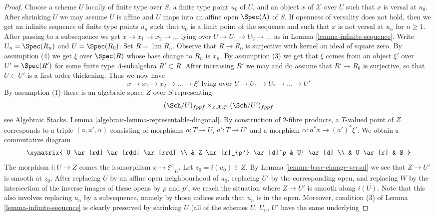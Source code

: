 \begin{proof}
Choose a scheme $U$ locally of finite type over $S$,
a finite type point $u_0$ of $U$, and an object $x$ of $\mathcal{X}$
over $U$ such that $x$ is versal at $u_0$. After shrinking
$U$ we may assume $U$ is affine and $U$ maps into an affine open
$\Spec(\Lambda)$ of $S$. If openness of versality does not hold,
then we get an infinite sequence of finite type points $u_n$ such
that $u_0$ is a limit point of the sequence and such that $x$ is not versal
at $u_n$ for $n \geq 1$. After passing to a subsequence we
get $x \to x_1 \to x_2 \to \ldots$ lying over
$U \to U_1 \to U_2 \to \ldots$ as in Lemma \ref{lemma-infinite-sequence}.
Write $U_n = \Spec(R_n)$ and $U = \Spec(R_0)$.
Set $R = \lim R_n$. Observe that $R \to R_0$ is surjective
with kernel an ideal of square zero. By assumption (4)
we get $\xi$ over $\Spec(R)$ whose base change to $R_n$ is $x_n$.
By assumption (3) we get that $\xi$ comes from an object $\xi'$ over
$U' = \Spec(R')$ for some finite type $\Lambda$-subalgebra
$R' \subset R$. After increasing $R'$ we may and do assume that
$R' \to R_0$ is surjective, so that $U \subset U'$ is a first order thickening.
Thus we now have
$$
x \to x_1 \to x_2 \to \ldots \to \xi'
\text{ lying over }
U \to U_1 \to U_2 \to \ldots \to U'
$$
By assumption (1) there is an algebraic space $Z$ over $S$ representing
$$
(\Sch/U)_{fppf} \times_{x, \mathcal{X}, \xi'} (\Sch/U')_{fppf}
$$
see Algebraic Stacks, Lemma \ref{algebraic-lemma-representable-diagonal}.
By construction of $2$-fibre products, a $T$-valued point of $Z$
corresponds to a triple $(a, a', \alpha)$ consisting of morphisms
$a : T \to U$, $a' : T \to U'$ and a morphism $\alpha : a^*x \to (a')^*\xi'$.
We obtain a commutative diagram
$$
\xymatrix{
U \ar[rd] \ar[rdd] \ar[rrd] \\
& Z \ar[r]_{p'} \ar[d]^p & U' \ar[d] \\
& U \ar[r] & S
}
$$
The morphism $i : U \to Z$ comes the isomorphism $x \to \xi'|_U$.
Let $z_0 = i(u_0) \in Z$. By Lemma \ref{lemma-base-change-versal}
we see that $Z \to U'$ is smooth at $z_0$. After replacing $U$ by an
affine open neighbourhood of $u_0$, replacing $U'$ by the corresponding
open, and replacing $W$ by the intersection of the inverse images
of these opens by $p$ and $p'$, we reach the situation where
$Z \to U'$ is smooth along $i(U)$. Note that this
also involves replacing $u_n$ by a subsequence, namely
by those indices such that $u_n$ is in the open. Moreover, condition
(3) of Lemma \ref{lemma-infinite-sequence}
is clearly preserved by shrinking $U$
(all of the schemes $U$, $U_n$, $U'$ have the same underlying

\end{proof}

